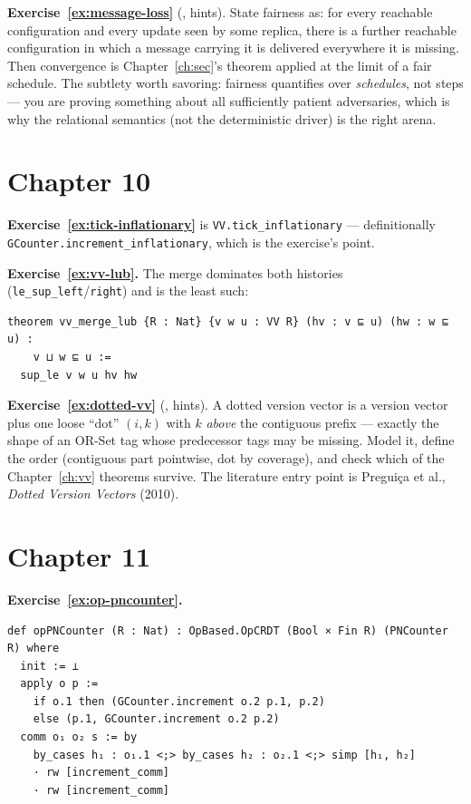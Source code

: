 \documentclass[12pt, a4paper, openright]{book}
\theoremstyle{thmstyle}
\theoremstyle{defstyle}
\newcommand{\lc}[1]{\texttt{#1}}
\newcounter{exercise}[chapter]
\begin{document}
\textbf{Exercise~\ref{ex:message-loss}} (,
hints). State fairness as: for every reachable configuration and every
update seen by some replica, there is a further reachable configuration
in which a message carrying it is delivered everywhere it is missing.
Then convergence is Chapter~\ref{ch:sec}'s theorem applied at the limit
of a fair schedule. The subtlety worth savoring: fairness quantifies
over \emph{schedules}, not steps --- you are proving something about
all sufficiently patient adversaries, which is why the relational
semantics (not the deterministic driver) is the right arena.

\section*{Chapter 10}

\textbf{Exercise~\ref{ex:tick-inflationary}} is
\lc{VV.tick_inflationary} --- definitionally
\lc{GCounter.increment_inflationary}, which is the exercise's point.

\textbf{Exercise~\ref{ex:vv-lub}.} The merge dominates both histories
(\lc{le_sup_left}/\lc{right}) and is the least such:

\begin{verbatim}
theorem vv_merge_lub {R : Nat} {v w u : VV R} (hv : v ⊑ u) (hw : w ⊑ u) :
    v ⊔ w ⊑ u :=
  sup_le v w u hv hw
\end{verbatim}

\textbf{Exercise~\ref{ex:dotted-vv}} (,
hints). A dotted version vector is a version vector plus one loose
``dot'' $(i, k)$ with $k$ \emph{above} the contiguous prefix --- exactly
the shape of an OR-Set tag whose predecessor tags may be missing. Model
it, define the order (contiguous part pointwise, dot by coverage), and
check which of the Chapter~\ref{ch:vv} theorems survive. The literature
entry point is Preguiça et al., \emph{Dotted Version Vectors} (2010).

\section*{Chapter 11}

\textbf{Exercise~\ref{ex:op-pncounter}.}

\begin{verbatim}
def opPNCounter (R : Nat) : OpBased.OpCRDT (Bool × Fin R) (PNCounter R) where
  init := ⊥
  apply o p :=
    if o.1 then (GCounter.increment o.2 p.1, p.2)
    else (p.1, GCounter.increment o.2 p.2)
  comm o₁ o₂ s := by
    by_cases h₁ : o₁.1 <;> by_cases h₂ : o₂.1 <;> simp [h₁, h₂]
    · rw [increment_comm]
    · rw [increment_comm]
\end{verbatim}
\end{document}
